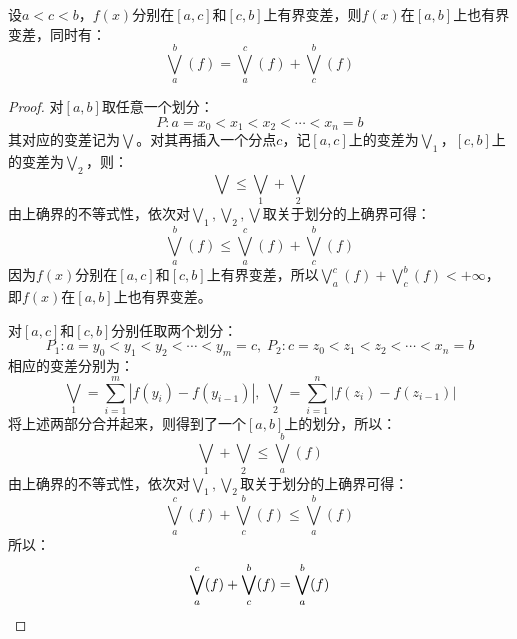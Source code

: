 \begin{theorem}\label{theo:有界变差关于区间的可加性}
	设$a<c<b$，$f(x)$分别在$[a,c]$和$[c,b]$上有界变差，则$f(x)$在$[a,b]$上也有界变差，同时有：
	\begin{equation*}
		\bigvee_{a}^{b}(f)=\bigvee_{a}^{c}(f)+\bigvee_{c}^{b}(f)
	\end{equation*}
\end{theorem}
\begin{proof}
	对$[a,b]$取任意一个划分：
	\begin{equation*}
		P:a=x_0<x_1<x_2<\cdots<x_n=b
	\end{equation*}
	其对应的变差记为$\bigvee$。对其再插入一个分点$c$，记$[a,c]$上的变差为$\bigvee_1$，$[c,b]$上的变差为$\bigvee_2$，则：
	\begin{equation*}
		\bigvee\leqslant\bigvee_1+\bigvee_2
	\end{equation*}
	由上确界的不等式性，依次对$\bigvee_1,\bigvee_2,\bigvee$取关于划分的上确界可得：
	\begin{equation*}
		\bigvee_{a}^{b}(f)\leqslant\bigvee_{a}^{c}(f)+\bigvee_{c}^{b}(f)
	\end{equation*}
	因为$f(x)$分别在$[a,c]$和$[c,b]$上有界变差，所以$\bigvee_{a}^{c}(f)+\bigvee_{c}^{b}(f)<+\infty$，即$f(x)$在$[a,b]$上也有界变差。\par
	对$[a,c]$和$[c,b]$分别任取两个划分：
	\begin{equation*}
		P_1:a=y_0<y_1<y_2<\cdots<y_m=c,\;
		P_2:c=z_0<z_1<z_2<\cdots<x_n=b
	\end{equation*}
	相应的变差分别为：
	\begin{equation*}
		\bigvee_1=\sum_{i=1}^{m}|f(y_i)-f(y_{i-1})|,\;\bigvee_2=\sum_{i=1}^{n}|f(z_i)-f(z_{i-1})|
	\end{equation*}
	将上述两部分合并起来，则得到了一个$[a,b]$上的划分，所以：
	\begin{equation*}
		\bigvee_1+\bigvee_2\leqslant\bigvee_{a}^{b}(f)
	\end{equation*}
	由上确界的不等式性，依次对$\bigvee_1,\bigvee_2$取关于划分的上确界可得：
	\begin{equation*}
		\bigvee_{a}^{c}(f)+\bigvee_{c}^{b}(f)\leqslant\bigvee_{a}^{b}(f)
	\end{equation*}
	所以：
	\begin{equation*}
		\bigvee_{a}^{c}(f)+\bigvee_{c}^{b}(f)=\bigvee_{a}^{b}(f)\qedhere
	\end{equation*}
\end{proof}
